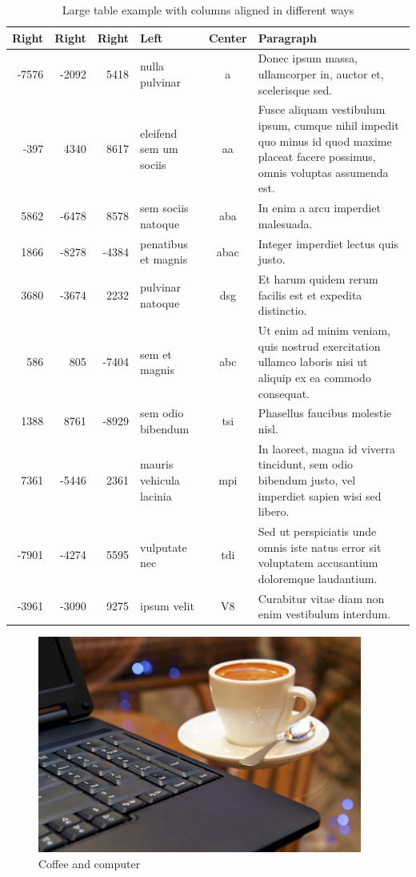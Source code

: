 \begin{table}
	\centering
	\caption{Large table example with columns aligned in different ways}
	\label{tab:Sidewaystable}
\begin{tabular}{rrrlcp{95mm}}
\toprule
Right	&	Right	&	Right	&	Left					&	Center	&	Paragraph	\\
\midrule
-7576	&	-2092	&	5418	&	nulla pulvinar			&	a		&	Donec ipsum massa, ullamcorper in, auctor et, scelerisque sed.	\\
-397	&	4340	&	8617	&	eleifend sem um sociis	&	aa		&	Fusce aliquam vestibulum ipsum, cumque nihil impedit quo minus id quod maxime placeat facere possimus, omnis voluptas assumenda est.	\\
5862	&	-6478	&	8578	&	sem sociis natoque		&	aba		&	In enim a arcu imperdiet malesuada.	\\
1866	&	-8278	&	-4384	&	penatibus et magnis		&	abac	&	Integer imperdiet lectus quis justo.	\\
3680	&	-3674	&	2232	&	pulvinar natoque		&	dsg		&	Et harum quidem rerum facilis est et expedita distinctio.	\\
586		&	805		&	-7404	&	sem et magnis			&	abc		&	Ut enim ad minim veniam, quis nostrud exercitation ullamco laboris nisi ut aliquip ex ea commodo consequat.	\\
1388	&	8761	&	-8929	&	sem odio bibendum		&	tsi		&	Phasellus faucibus molestie nisl.	\\
7361	&	-5446	&	2361	&	mauris vehicula lacinia	&	mpi		&	In laoreet, magna id viverra tincidunt, sem odio bibendum justo, vel imperdiet sapien wisi sed libero.	\\
-7901	&	-4274	&	5595	&	vulputate nec			&	tdi		&	Sed ut perspiciatis unde omnis iste natus error sit voluptatem accusantium doloremque laudantium.	\\
-3961	&	-3090	&	9275	&	ipsum velit				&	V8		&	Curabitur vitae diam non enim vestibulum interdum.	\\
\bottomrule
\end{tabular}
\end{table}


\begin{figure}
	\centering
	\includegraphics[width=0.95\textwidth]{Figures/CoffeeAndComputer.jpg}
	\caption{Coffee and computer \cite{AhDTEmY2CY7Qv65e}}
	\label{fig:CoffeAndComputerInAppendix}
\end{figure}
\endinput